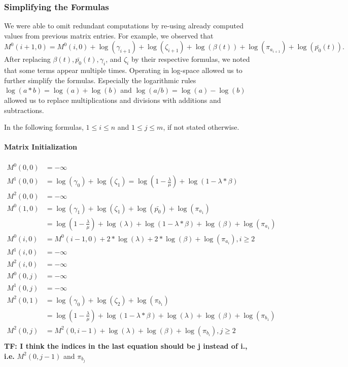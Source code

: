 \documentclass[runningheads,a4paper]{llncs}
\begin{document}
\subsubsection{Simplifying the Formulas}  
We were able to omit redundant computations by re-using already computed values from previous matrix entries.
For example, we observed that $$M^0(i+1,0) = M^0(i,0) + \log(\gamma_{i+1}) + \log(\zeta_{i+1}) + \log(\beta(t)) + \log(\pi_{a_{i+1}}) + \log(\bar{p_0}(t)).$$
After replacing $\beta(t), \bar{p_0}(t), \gamma_i$, and $\zeta_i$ by their respective formulas, we noted that some terms appear multiple times. 
Operating in log-space allowed us to further simplify the formulas. Especially the logarithmic rules $\log(a*b) = \log(a) + \log(b)$ and $\log(a/b) = \log(a) - \log(b)$ 
allowed us to replace multiplications and divisions with additions and subtractions.

In the following formulas, $1 \leq i \leq n$ and $1 \leq j \leq m$, if not stated otherwise.

\paragraph{Matrix Initialization}
\label{sec:formulas:init}
\begin{align*}
M^0(0,0) &= -\infty \\
M^1(0,0) &= \log(\gamma_0) + \log(\zeta_1)
		= \log(1-\frac{\lambda}{\mu}) + \log (1 - \lambda * \beta) \\
M^2(0,0) &= -\infty \\
M^0(1,0) &= \log(\gamma_1) + \log(\zeta_1) + \log(\bar{p_0}) + \log(\pi_{a_1}) \\
		&= \log(1- \frac{\lambda}{\mu}) + \log(\lambda) + \log(1- \lambda *\beta) + \log(\beta) + \log(\pi_{a_1}) \\
M^0(i,0) &= M^0(i-1,0) + 2*\log(\lambda) + 2*\log(\beta) + \log(\pi_{a_i}), i \geq 2 \\
M^1(i,0) &= -\infty \\
M^2(i,0) &= -\infty \\
M^0(0,j) &= -\infty \\
M^1(0,j) &= -\infty \\
M^2(0,1) &= \log(\gamma_0) + \log(\zeta_2) + \log(\pi_{b_1}) \\
		&= \log(1- \frac{\lambda}{\mu}) + \log(1-\lambda*\beta) + \log(\lambda) + \log(\beta) + \log(\pi_{b_1}) \\
M^2(0,j) &= M^2(0, i-1) + \log(\lambda) + \log(\beta) + \log(\pi_{b_i}), j \geq 2 \\
\end{align*}
\textbf{TF: I think the indices in the last equation should be j instead of i., i.e.} $M^2(0,j-1)$ and $\pi_{b_j}$
\end{document}
